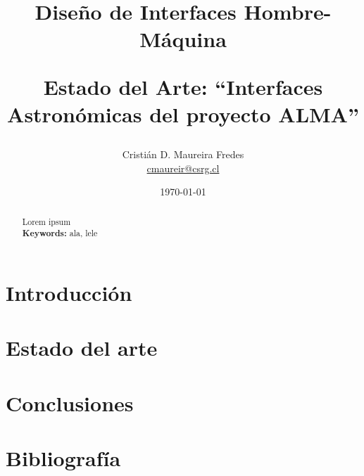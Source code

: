 \documentclass[letter, 10pt]{article}
\begin{document}
%
\pagestyle{empty}

\title{Diseño de Interfaces Hombre-Máquina \\ \begin{Large}Estado del Arte: ``Interfaces Astronómicas del proyecto ALMA''\end{Large}}
\author{Cristián D. Maureira Fredes\\\url{cmaureir@csrg.cl}}
\date{\today}

\maketitle
\begin{abstract}
Lorem ipsum\\
{\bf Keywords: } ala, lele
\end{abstract}



\section{Introducción}
\label{sec:introduccion}


\section{Estado del arte}
\label{sec:estado_arte}


\section{Conclusiones}
\label{sec:conclusiones}


\section{Bibliografía}
%
\end{document}
